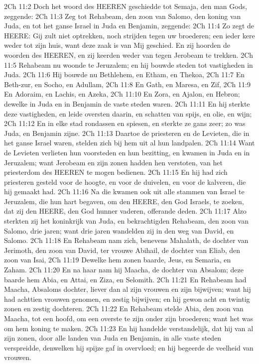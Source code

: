 2Ch 11:2  Doch het woord des HEEREN geschiedde tot Semaja, den man Gods, zeggende:
2Ch 11:3  Zeg tot Rehabeam, den zoon van Salomo, den koning van Juda, en tot het ganse Israel in Juda en Benjamin, zeggende:
2Ch 11:4  Zo zegt de HEERE: Gij zult niet optrekken, noch strijden tegen uw broederen; een ieder kere weder tot zijn huis, want deze zaak is van Mij geschied. En zij hoorden de woorden des HEEREN, en zij keerden weder van tegen Jerobeam te trekken.
2Ch 11:5  Rehabeam nu woonde te Jeruzalem; en hij bouwde steden tot vastigheden in Juda.
2Ch 11:6  Hij bouwde nu Bethlehem, en Etham, en Thekoa,
2Ch 11:7  En Beth-zur, en Socho, en Adullam,
2Ch 11:8  En Gath, en Maresa, en Zif,
2Ch 11:9  En Adoraim, en Lachis, en Azeka,
2Ch 11:10  En Zora, en Ajalon, en Hebron; dewelke in Juda en in Benjamin de vaste steden waren.
2Ch 11:11  En hij sterkte deze vastigheden, en leide oversten daarin, en schatten van spijs, en olie, en wijn;
2Ch 11:12  En in elke stad rondassen en spiesen, en sterkte ze gans zeer; zo was Juda, en Benjamin zijne.
2Ch 11:13  Daartoe de priesteren en de Levieten, die in het ganse Israel waren, stelden zich bij hem uit al hun landpalen.
2Ch 11:14  Want de Levieten verlieten hun voorsteden en hun bezitting, en kwamen in Juda en in Jeruzalem; want Jerobeam en zijn zonen hadden hen verstoten, van het priesterdom des HEEREN te mogen bedienen.
2Ch 11:15  En hij had zich priesteren gesteld voor de hoogte, en voor de duivelen, en voor de kalveren, die hij gemaakt had.
2Ch 11:16  Na die kwamen ook uit alle stammen van Israel te Jeruzalem, die hun hart begaven, om den HEERE, den God Israels, te zoeken, dat zij den HEERE, den God hunner vaderen, offerande deden.
2Ch 11:17  Alzo sterkten zij het koninkrijk van Juda, en bekrachtigden Rehabeam, den zoon van Salomo, drie jaren; want drie jaren wandelden zij in den weg van David, en Salomo.
2Ch 11:18  En Rehabeam nam zich, benevens Mahalath, de dochter van Jerimoth, den zoon van David, ter vrouwe Abihail, de dochter van Eliab, den zoon van Isai,
2Ch 11:19  Dewelke hem zonen baarde, Jeus, en Semaria, en Zaham.
2Ch 11:20  En na haar nam hij Maacha, de dochter van Absalom; deze baarde hem Abia, en Attai, en Ziza, en Selomith.
2Ch 11:21  En Rehabeam had Maacha, Absaloms dochter, liever dan al zijn vrouwen en zijn bijwijven; want hij had achttien vrouwen genomen, en zestig bijwijven; en hij gewon acht en twintig zonen en zestig dochteren.
2Ch 11:22  En Rehabeam stelde Abia, den zoon van Maacha, tot een hoofd, om een overste te zijn onder zijn broederen; want het was om hem koning te maken.
2Ch 11:23  En hij handelde verstandelijk, dat hij van al zijn zonen, door alle landen van Juda en Benjamin, in alle vaste steden verspreidde, denwelken hij spijze gaf in overvloed; en hij begeerde de veelheid van vrouwen.
